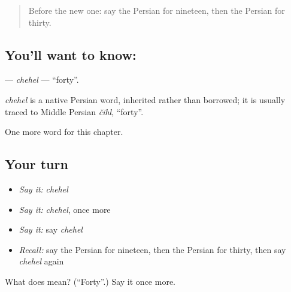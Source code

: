 \begin{quote}
Before the new one: say the Persian for nineteen, then the Persian for thirty.
\end{quote}

\subsection*{You'll want to know: }
\textbf{} — \emph{chehel} — \textquotedblleft{}forty\textquotedblright{}.

\begin{cousinweb}
\emph{chehel} is a native Persian word, inherited rather than borrowed; it is usually traced to Middle Persian \emph{čihl}, \textquotedblleft{}forty\textquotedblright{}.
\end{cousinweb}

\begin{grammarlens}[title={What you've built}]
One more word for this chapter.
\end{grammarlens}

\subsection*{Your turn}
\begin{itemize}
\raggedright
  \item \emph{Say it:} \emph{chehel}
  \item \emph{Say it:} \emph{chehel}, once more
  \item \emph{Say it:} say \emph{chehel}
  \item \emph{Recall:} say the Persian for nineteen, then the Persian for thirty, then say \emph{chehel} again
\end{itemize}

\begin{tcolorbox}[breakable,colback=teal!4,colframe=teal!35!black,title={Before you move on}]
What does  mean? (\textquotedblleft{}Forty\textquotedblright{}.) Say it once more.
\end{tcolorbox}
